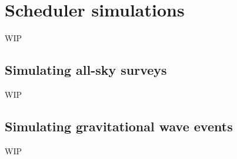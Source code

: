 \newpage
\section{Scheduler simulations}
\label{sec:simulations}
\begin{colsection}


\begin{colsection}

WIP

\end{colsection}


\subsection{Simulating all-sky surveys}
\label{sec:survey_simulations}
\begin{colsection}

WIP

\end{colsection}


\subsection{Simulating gravitational wave events}
\label{sec:gw_simulations}
\begin{colsection}

WIP

\end{colsection}


\end{colsection}


\newpage
